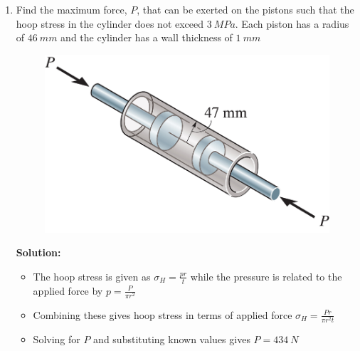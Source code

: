 \documentclass[12pt, oneside]{article}
\begin{document}
\begin{enumerate}
	\item %
		Find the maximum force, $P$, that can be exerted on the pistons such that the hoop stress in the cylinder does not exceed $\SI{3}{MPa}$.
		Each piston has a radius of $\SI{46}{mm}$ and the cylinder has a wall thickness of $\SI{1 }{mm}$
		\begin{figure}[H]
			\centering
			\includegraphics[width=0.6\linewidth]{8-6}
		\end{figure}
			\textbf{Solution:}
			\begin{itemize}
				\item The hoop stress is given as $\sigma_H = \frac{pr}{t}$ while the pressure is related to the applied force by $p = \frac{P}{\pi r^2}$
				\item Combining these gives hoop stress in terms of applied force $\sigma_H = \frac{Pr}{\pi r^2 t}$
				\item Solving for $P$ and substituting known values gives $P = 	\SI{434}{N} $
			\end{itemize}


\end{enumerate}
\end{document}
